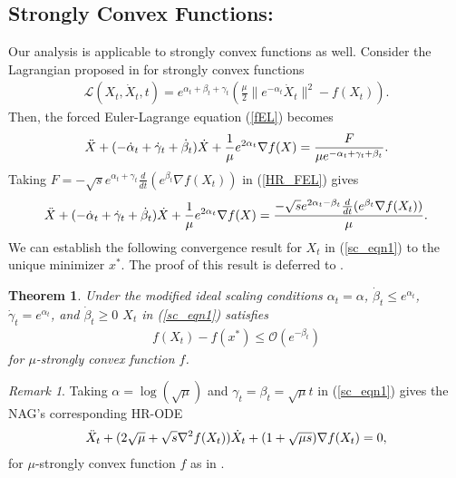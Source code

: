 \documentclass{article}
\theoremstyle{plain}
\newtheorem{theorem}{Theorem}[section]
\theoremstyle{definition}
\theoremstyle{remark}
\newtheorem{remark}{Remark}[theorem]
\begin{document}
\subsection{Strongly Convex Functions:} Our analysis is applicable to strongly convex functions as well. Consider the Lagrangian proposed in \citep{wilson2021lyapunov} for strongly convex functions
\begin{align}\label{strongly_cvx_lagrange}
    \mathcal{L}(X_t,\dot X_t,t)=e^{\alpha_t+\beta_t+\gamma_t}\left( \frac{\mu}{2}\|e^{-\alpha_t}\dot X_t\|^2-f(X_t)\right).
\end{align}
Then, the forced Euler-Lagrange equation (\ref{fEL}) becomes
\begin{align}\label{HR_FEL}
    \Ddot{X}+(-\dot \alpha_t + \dot 
 \gamma_t+ \dot \beta_t)\dot X+\frac{1}{\mu}e^{2\alpha_t}\nabla f(X)=\frac{F}{\mu e^{-\alpha_t + \gamma_t + \beta_t}}.
\end{align}
Taking \({F=-\sqrt{s}e^{\alpha_t+\gamma_t}\frac{d}{dt}(e^{\beta_t}\nabla f(X_t))}\) in (\ref{HR_FEL}) gives
\begin{align}\label{sc_eqn1}
    \Ddot{X}+(-\dot \alpha_t + \dot 
 \gamma_t+ \dot \beta_t)\dot X+\frac{1}{\mu}e^{2\alpha_t}\nabla f(X)=\frac{-\sqrt{s}e^{2\alpha_t-\beta_t}\frac{d}{dt}(e^{\beta_t}\nabla f(X_t))}{\mu }.
\end{align}
We can establish the following convergence result for \(X_t\) in (\ref{sc_eqn1}) to the unique minimizer \(x^*\). The proof of this result is deferred to .
\begin{theorem}\label{Theorem3_1}
    Under the modified ideal scaling conditions \(\alpha_t=\alpha\), \(\dot \beta_t\leq e^{\alpha_t}\), \(\dot \gamma_t=e^{\alpha_t}\), and \(\dot \beta_t\geq 0\) \(X_t\) in (\ref{sc_eqn1}) satisfies
    \begin{align}\label{Theorem32_eqn1}
      f(X_t)-f(x^*)\leq \mathcal{O}(e^{-\beta_t})  
    \end{align}
    for \(\mu\)-strongly convex function \(f\).
\end{theorem}
\begin{remark}
    Taking \(\alpha=\log(\sqrt{\mu})\) and \(\gamma_t=\beta_t=\sqrt{\mu}t\) in (\ref{sc_eqn1}) gives the NAG's corresponding HR-ODE 
\begin{align}\label{high-res-ODE}
    \Ddot{X}_t+(2\sqrt{\mu}+\sqrt{s}\nabla^2 f(X_t))\dot X_t +(1+\sqrt{\mu s })\nabla f(X_t)=0,
\end{align}
for \(\mu\)-strongly convex function \(f\) as in \citep{Shi2021UnderstandingTA}.
\end{remark}
\end{document}
